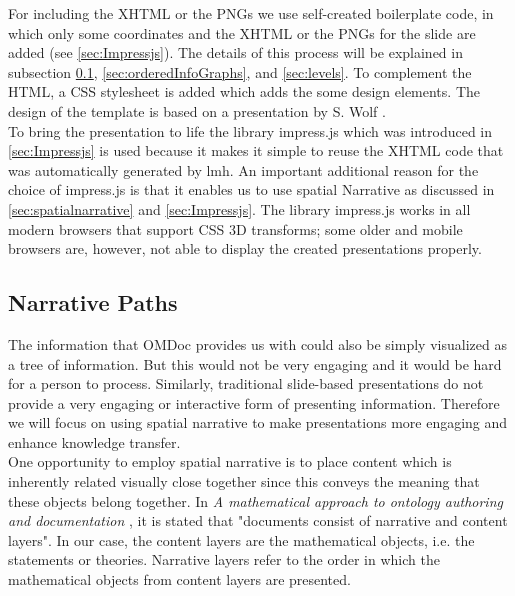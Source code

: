 \documentclass[twoside, 12pt]{article}
\begin{document}
For including the XHTML or the PNGs we use self-created boilerplate code, in which only some coordinates and the XHTML or the PNGs for the slide are added (see \autoref{sec:Impressjs}). The details of this process will be explained in subsection \ref{sec:narrativePaths}, \ref{sec:orderedInfoGraphs}, and \ref{sec:levels}. To complement the HTML, a CSS stylesheet is added which adds the some design elements. The design of the template is based on a presentation by S. Wolf \cite{Wolf:npentrel15}.\\

To bring the presentation to life the library impress.js which was introduced in \autoref{sec:Impressjs} is used because it makes it simple to reuse the XHTML code that was automatically generated by lmh. An important additional reason for the choice of impress.js \cite{JSImpress:npentrel14} is that it enables us to use spatial Narrative as discussed in \autoref{sec:spatialnarrative} and \autoref{sec:Impressjs}. The library impress.js works in all modern browsers that support CSS 3D transforms; some older and mobile browsers are, however, not able to display the created presentations properly.

\subsection{Narrative Paths}
\label{sec:narrativePaths}

The information that OMDoc provides us with could also be simply visualized as a tree of information. But this would not be very engaging and it would be hard for a person to process. Similarly, traditional slide-based presentations do not provide a very engaging or interactive form of presenting information. Therefore we will focus on using spatial narrative to make presentations more engaging and enhance knowledge transfer.\\ 

One opportunity to employ spatial narrative is to place content which is inherently related visually close together since this conveys the meaning that these objects belong together. In \textit{A mathematical approach to ontology authoring and documentation} \cite{LK:MathOntoAuthDoc09}, it is stated that "documents consist of narrative and content layers". In our case, the content layers are the mathematical objects, i.e. the statements or theories. Narrative layers refer to the order in which the mathematical objects from content layers are presented.\\
\end{document}
